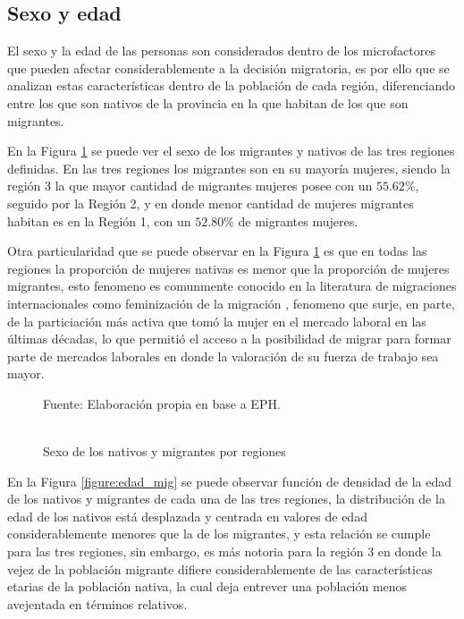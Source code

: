 \documentclass[12pt,a4paper]{article}
\begin{document}
\subsection{Sexo y edad}
El sexo y la edad de las personas son considerados dentro de los microfactores que pueden afectar considerablemente a la decisión migratoria, es por ello que se analizan estas características dentro de la población de cada región, diferenciando entre los que son nativos de la provincia en la que habitan de los que son migrantes.

En la Figura \ref{figure:sexo_mig_} se puede ver el sexo de los migrantes y nativos de las tres regiones definidas. En las tres regiones los migrantes  son en su mayoría mujeres, siendo la región 3 la que mayor cantidad de migrantes mujeres posee con un $55.62\%$, seguido por la Región 2, y en donde menor cantidad de mujeres migrantes habitan es en la Región 1, con un $52.80\%$ de migrantes mujeres.

Otra particularidad que se puede observar en la Figura \ref{figure:sexo_mig_} es que en todas las regiones la proporción de mujeres nativas es menor que la proporción de mujeres migrantes, esto fenomeno es comunmente conocido en la literatura de migraciones internacionales como feminización de la migración \parencite{carling_gender_2005}, fenomeno que surje, en parte, de la particiación más activa que tomó la mujer en el mercado laboral en las últimas décadas, lo que permitió el acceso a la posibilidad de migrar para formar parte de mercados laborales en donde la valoración de su fuerza de trabajo sea mayor.

\begin{figure}[ht!]
\begin{center}
 	\caption{\\Sexo de los nativos y migrantes por regiones}
 
 	\label{figure:sexo_mig_}
\begin{flushleft}
\begin{scriptsize}
Fuente: Elaboración propia en base a EPH.
\end{scriptsize}
\end{flushleft}
\end{center}
\end{figure}

\newpage
En la Figura \ref{figure:edad_mig} se puede observar función de densidad de la edad de los nativos y migrantes de cada una de las tres regiones, la distribución de la edad de los nativos  está desplazada y centrada en valores de edad considerablemente menores que la de los migrantes, y esta relación se cumple para las tres regiones, sin embargo, es más notoria para la región 3 en donde la vejez de la población migrante difiere considerablemente de las características etarias de la población nativa, la cual deja entrever una población menos avejentada en términos relativos.
\end{document}
